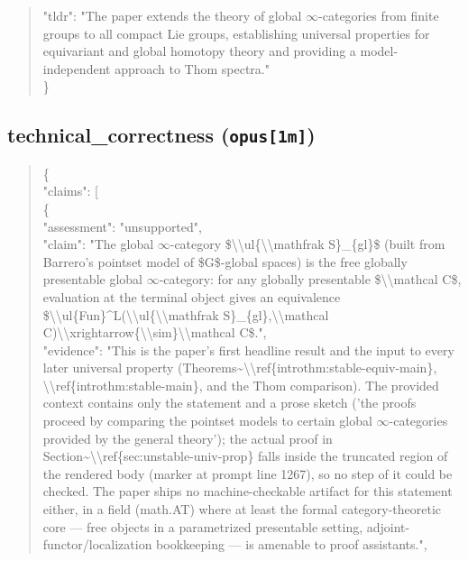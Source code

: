 \documentclass[11pt]{article}
\begin{document}
\begin{quote}
  "tldr": "The paper extends the theory of global \ensuremath{\infty}-categories from finite groups to all compact Lie groups, establishing universal properties for equivariant and global homotopy theory and providing a model-independent approach to Thom spectra."\\
\}\\
\end{quote}

\subsection*{technical\_correctness (\texttt{opus[1m]})}
\begin{quote}\small\ttfamily\raggedright
\{\\
  "claims": [\\
    \{\\
      "assessment": "unsupported",\\
      "claim": "The global \ensuremath{\infty}-category \$\textbackslash{}\textbackslash{}ul\{\textbackslash{}\textbackslash{}mathfrak S\}\_\{gl\}\$ (built from Barrero's pointset model of \$G\$-global spaces) is the free globally presentable global \ensuremath{\infty}-category: for any globally presentable \$\textbackslash{}\textbackslash{}mathcal C\$, evaluation at the terminal object gives an equivalence \$\textbackslash{}\textbackslash{}ul\{Fun\}\^{}L(\textbackslash{}\textbackslash{}ul\{\textbackslash{}\textbackslash{}mathfrak S\}\_\{gl\},\textbackslash{}\textbackslash{}mathcal C)\textbackslash{}\textbackslash{}xrightarrow\{\textbackslash{}\textbackslash{}sim\}\textbackslash{}\textbackslash{}mathcal C\$.",\\
      "evidence": "This is the paper's first headline result and the input to every later universal property (Theorems\~{}\textbackslash{}\textbackslash{}ref\{introthm:stable-equiv-main\}, \textbackslash{}\textbackslash{}ref\{introthm:stable-main\}, and the Thom comparison). The provided context contains only the statement and a prose sketch ('the proofs proceed by comparing the pointset models to certain global \ensuremath{\infty}-categories provided by the general theory'); the actual proof in Section\~{}\textbackslash{}\textbackslash{}ref\{sec:unstable-univ-prop\} falls inside the truncated region of the rendered body (marker at prompt line 1267), so no step of it could be checked. The paper ships no machine-checkable artifact for this statement either, in a field (math.AT) where at least the formal category-theoretic core --- free objects in a parametrized presentable setting, adjoint-functor/localization bookkeeping --- is amenable to proof assistants.",\\

\end{quote}
\end{document}
